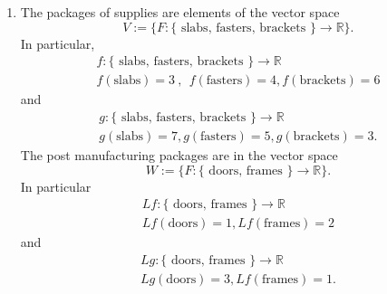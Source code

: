 \documentclass[12pt]{article}
\def\R{{\mathbb{R}}}
\begin{document}
\begin{enumerate}
\begin{enumerate}
\item 
The packages of supplies are elements of the vector space 
\[ V:=\{  F: \{ \text{ slabs, fasters, brackets }\} \to \mathbb{R}\}.\]
In particular, 
\begin{gather*} f: \{ \text{ slabs, fasters, brackets }\} \to \mathbb{R}\\
f(\text{slabs})=3~,~~f(\text{fasters})=4, f(\text{brackets})= 6\end{gather*}
and
\begin{gather*} g: \{ \text{ slabs, fasters, brackets } \} \to \mathbb{R}\\
g(\text{slabs})=7,g(\text{fasters})=5, g(\text{brackets})= 3. \end{gather*}
The post manufacturing packages are  in the vector space 
\[W :=\{ F: \{\text{ doors, frames } \}\to \R\} .\]
In particular
\begin{gather*}Lf:  \{\text{ doors, frames }\} \to \mathbb{R}\\
Lf(\text{doors})=1,Lf(\text{frames})=2 \end{gather*}
and
\begin{gather*}Lg:  \{\text{ doors, frames } \} \to \mathbb{R}\\
Lg(\text{doors})=3,Lf(\text{frames})=1.\end{gather*}


\end{enumerate}
\end{enumerate}
\end{document}
